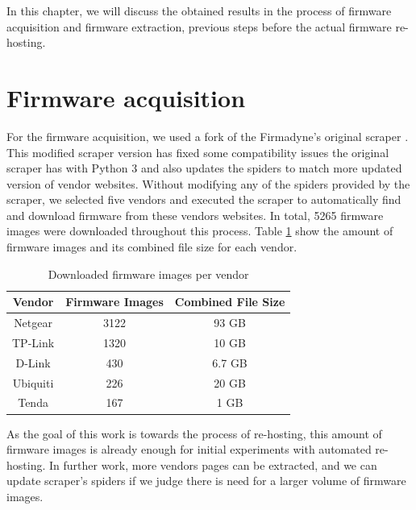 In this chapter, we will discuss the obtained results in the process of firmware acquisition and firmware extraction, previous steps before the actual firmware re-hosting.

\section{Firmware acquisition}

For the firmware acquisition, we used a fork of the Firmadyne's \cite{firmadyne} original scraper \cite{github:scraper}. This modified scraper version has fixed some compatibility issues the original scraper has with Python 3 and also updates the spiders to match more updated version of vendor websites. Without modifying any of the spiders provided by the scraper, we selected five vendors and executed the scraper to automatically find and download firmware from these vendors websites. In total, 5265 firmware images were downloaded throughout this process. Table \ref{tab:scraper} show the amount of firmware images and its combined file size for each vendor.

\begin{table}[h]
\centering
\caption{Downloaded firmware images per vendor}
\begin{tabular}{|c|c|c|}
\hline
\textbf{Vendor} & \textbf{Firmware Images} & \textbf{Combined File Size} \\ \hline
Netgear         & 3122                     & 93 GB                       \\ \hline
TP-Link         & 1320                     & 10 GB                       \\ \hline
D-Link          & 430                      & 6.7 GB                      \\ \hline
Ubiquiti        & 226                      & 20 GB                       \\ \hline
Tenda           & 167                      & 1 GB                        \\ \hline
\end{tabular}
\label{tab:scraper}
\end{table}

As the goal of this work is towards the process of re-hosting, this amount of firmware images is already enough for initial experiments with automated re-hosting. In further work, more vendors pages can be extracted, and we can update scraper's spiders if we judge there is need for a larger volume of firmware images.

